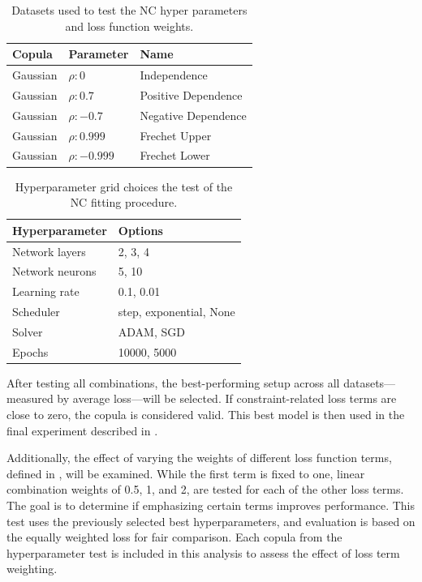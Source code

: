 \begin{table}[h!]
    \centering
    \caption{Datasets used to test the \gls{NC} hyper parameters and loss function weights.}
    \begin{tabular}{lll}
    \textbf{Copula} & \textbf{Parameter} & \textbf{Name}  \\
    \hline
    Gaussian & $\rho:0$ & Independence \\
    Gaussian & $\rho:0.7$ & Positive Dependence \\
    Gaussian & $\rho:-0.7$ & Negative Dependence \\
    Gaussian & $\rho:0.999$ & Frechet Upper \\
    Gaussian & $\rho:-0.999$ & Frechet Lower \\
    \end{tabular}
    \label{tab:DatasetsTestedOn}
\end{table}

\begin{table}[h!]
    \centering
    \caption{Hyperparameter grid choices the test of the \gls{NC} fitting procedure.}
    \begin{tabular}{ll}
    \textbf{Hyperparameter} & \textbf{Options} \\
    \hline
    Network layers & 2, 3, 4 \\
    Network neurons & 5, 10 \\
    Learning rate & 0.1, 0.01 \\
    Scheduler & step, exponential, None \\
    Solver & ADAM, SGD \\
    Epochs & 10000, 5000 \\
    \end{tabular}
    \label{tab:se_hyperparams}
\end{table}


After testing all combinations, the best-performing setup across all datasets—measured by average loss—will be selected. If constraint-related loss terms are close to zero, the copula is considered valid. This best model is then used in the final experiment described in .

Additionally, the effect of varying the weights of different loss function terms, defined in , will be examined. While the first term is fixed to one, linear combination weights of 0.5, 1, and 2, are tested for each of the other loss terms. The goal is to determine if emphasizing certain terms improves performance. This test uses the previously selected best hyperparameters, and evaluation is based on the equally weighted loss for fair comparison. Each copula from the hyperparameter test is included in this analysis to assess the effect of loss term weighting.


